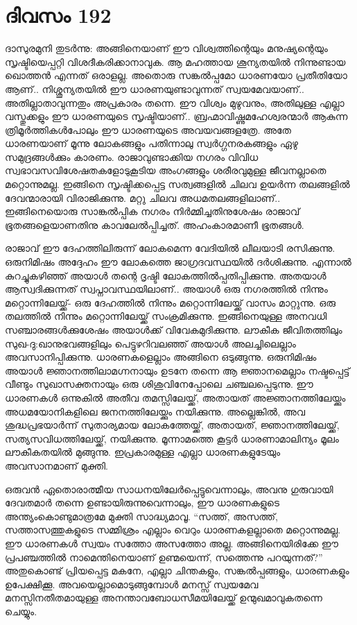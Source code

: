 \section{ദിവസം 192}


ദാസുരമുനി തുടർന്നു: അങ്ങിനെയാണ്‌ ഈ വിശ്വത്തിന്റെയും മനുഷ്യന്റെയും സൃഷ്ടിയെപ്പറ്റി വിശദീകരിക്കാനാവുക. ആ മഹത്തായ ശൂന്യതയിൽ നിന്നുണ്ടായ ഖൊത്തൻ എന്നത് ഒരാളല്ല. അതൊരു സങ്കൽപ്പമോ ധാരണയോ പ്രതീതിയോ ആണ്‌.. നിശ്ശൂന്യതയിൽ ഈ ധാരണയുണ്ടാവുന്നത് സ്വയമേവയാണ്‌.. അതില്ലാതാവുന്നതും അപ്രകാരം തന്നെ. ഈ വിശ്വം മുഴുവനും, അതിലുള്ള എല്ലാ വസ്തുക്കളും ഈ ധാരണയുടെ സൃഷ്ടിയാണ്‌.. ബ്രഹ്മാവിഷ്ണുമഹേശ്വരന്മാർ ആകുന്ന ത്രിമൂർത്തികൾപോലും ഈ ധാരണയുടെ അവയവങ്ങളത്രേ. അതേ ധാരണയാണ്‌ മൂന്നു ലോകങ്ങളും പതിന്നാലു സ്വർഗ്ഗനരകങ്ങളും ഏഴു സമുദ്രങ്ങൾക്കും കാരണം. രാജാവുണ്ടാക്കിയ നഗരം വിവിധ സ്വഭാവസവിശേഷതകളോടുകൂടിയ അംഗങ്ങളും ശരീരവുമുള്ള ജീവനല്ലാതെ മറ്റൊന്നുമല്ല. ഇങ്ങിനെ സൃഷ്ടിക്കപ്പെട്ട സത്വങ്ങളിൽ ചിലവ ഉയർന്ന തലങ്ങളിൽ ദേവന്മാരായി വിരാജിക്കുന്നു. മറ്റു ചിലവ അധമതലങ്ങളിലാണ്‌.. ഇങ്ങിനെയൊരു സാങ്കൽപ്പിക നഗരം നിർമ്മിച്ചതിനുശേഷം രാജാവ് ഭൂതങ്ങളെയാണതിനു കാവലേൽപ്പിച്ചത്. അഹംകാരമാണീ ഭൂതങ്ങൾ.

രാജാവ് ഈ ദേഹത്തിലിരുന്ന് ലോകമെന്ന വേദിയിൽ ലീലയാടി രസിക്കുന്നു. ഒരുനിമിഷം അദ്ദേഹം ഈ ലോകത്തെ ജാഗ്രദവസ്ഥയിൽ ദർശിക്കുന്നു. എന്നാൽ കുറച്ചുകഴിഞ്ഞ് അയാൾ തന്റെ ദൃഷ്ടി ലോകത്തിൽപ്പതിപ്പിക്കുന്നു. അതയാൾ ആസ്വദിക്കുന്നത് സ്വപ്നാവസ്ഥയിലാണ്‌.. അയാള്‍ ഒരു നഗരത്തിൽ നിന്നും മറ്റൊന്നിലേയ്ക്ക്- ഒരു ദേഹത്തിൽ നിന്നും മറ്റൊന്നിലേയ്ക്ക് വാസം മാറ്റുന്നു. ഒരു തലത്തിൽ നിന്നും മറ്റൊന്നിലേയ്ക്ക് സംക്രമിക്കുന്നു. ഇങ്ങിനെയുള്ള അനവധി സഞ്ചാരങ്ങൾക്കുശേഷം അയാൾക്ക് വിവേകമുദിക്കുന്നു. ലൗകീക ജീവിതത്തിലും സുഖ-ദു:ഖാനുഭവങ്ങളിലും പെട്ടുഴറിവലഞ്ഞ് അയാൾ അലച്ചിലെല്ലാം അവസാനിപ്പിക്കുന്നു. ധാരണകളെല്ലാം അങ്ങിനെ ഒടുങ്ങുന്നു. ഒരുനിമിഷം അയാൾ ജ്ഞാനത്തിലാമഗ്നനായും ഉടനേ തന്നെ ആ ജ്ഞാനമെല്ലാം നഷ്ടപ്പെട്ട് വീണ്ടും സുഖാസക്തനായും ഒരു ശിശുവിനേപ്പോലെ ചഞ്ചലപ്പെടുന്നു. ഈ ധാരണകൾ ഒന്നുകിൽ അതീവ തമസ്സിലേയ്ക്ക്, അതായത് അജ്ഞാനത്തിലേയ്ക്കും അധമയോനികളിലെ ജനനത്തിലേയ്ക്കും നയിക്കുന്നു. അല്ലെങ്കിൽ, അവ ശുദ്ധപ്രഭയാർന്ന് സുതാര്യമായ ലോകത്തേയ്ക്ക്, അതായത്, ജ്ഞാനത്തിലേയ്ക്ക്, സത്യസവിധത്തിലേയ്ക്ക്, നയിക്കുന്നു. മൂന്നാമത്തെ കൂട്ടർ ധാരണാമാലിന്യം മൂലം ലൗകീകതയിൽ മുങ്ങുന്നു. ഇപ്രകാരമുള്ള എല്ലാ ധാരണകളുടേയും അവസാനമാണ് മുക്തി.

ഒരുവൻ ഏതൊരാത്മീയ സാധനയിലേർപ്പെട്ടുവെന്നാലും, അവനു ഗുരുവായി ദേവതമാർ തന്നെ ഉണ്ടായിരുന്നുവെന്നാലും, ഈ ധാരണകളുടെ അന്ത്യംകൊണ്ടുമാത്രമേ മുക്തി സാദ്ധ്യമാവൂ. “സത്ത്, അസത്ത്, സത്താസത്തുകളുടെ സമ്മിശ്രം എല്ലാം വെറും ധാരണകളല്ലാതെ മറ്റൊന്നുമല്ല. ഈ ധാരണകൾ സ്വയം സത്തോ അസത്തോ അല്ല. അങ്ങിനെയിരിക്കേ ഈ പ്രപഞ്ചത്തിൽ നാമെന്തിനെയാണ്‌ ഉണ്മയെന്ന്, സത്തെന്നു പറയുന്നത്?” അതുകൊണ്ട് പ്രിയപ്പെട്ട മകനേ, എല്ലാ ചിന്തകളും, സങ്കൽപ്പങ്ങളും, ധാരണകളും ഉപേക്ഷിക്കൂ. അവയെല്ലാമൊടുങ്ങുമ്പോൾ മനസ്സ് സ്വയമേവ മനസ്സിനതീതമായുള്ള അനന്താവബോധസീമയിലേയ്ക്ക് ഉന്മുഖമാവുകതന്നെ ചെയ്യും. 

